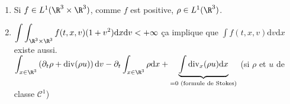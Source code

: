 \documentclass[12pt,a4paper]{article}
\begin{document}
\begin{rmq}$ $\\
	\begin{minipage}[t]{18.5cm}
		\begin{enumerate}[label=$\to$]
	\item Si $f \in L^1(\R^3\times\R^3)$, comme $f$ est positive, $\rho \in L^1(\R^3)$.
	
	\item  $\displaystyle\int\int_{\R^3\times\R^3} f(t,x,v)(1+v^2) \mathrm dx\mathrm dv < + \infty$ ça implique que $\displaystyle\int f(t,x,v) \mathrm dv\mathrm dx$ existe aussi. \\
	
	$\displaystyle\int _{x \in \R^3} \left(\partial_t \rho + \mathrm{div}(\rho u)\right)\mathrm dv - \partial_t \int_{x \in \R^3} \rho \mathrm dx + \underbrace{\int \mathrm{div}_x(\rho u)\mathrm dx}_{=0 \text{ (formule de Stokes)}}$ (si $\rho$ et $u$ de classe $\mathcal C^1$)
\end{enumerate}
	\end{minipage}
\end{rmq}
\end{document}
